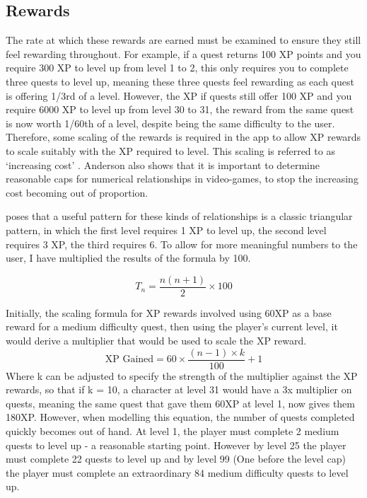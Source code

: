 \subsection{Rewards}
The rate at which these rewards are earned must be examined to ensure they still feel rewarding throughout. 
For example, if a quest returns 100 XP points and you require 300 XP to level up from level 1 to 2, this only requires you to complete three quests to level up, meaning these three quests feel rewarding as each quest is offering 1/3rd of a level.
However, the XP if quests still offer 100 XP and you require 6000 XP to level up from level 30 to 31, the reward from the same quest is now worth 1/60th of a level, despite being the same difficulty to the user.
Therefore, some scaling of the rewards is required in the app to allow XP rewards to scale suitably with the XP required to level.
This scaling is referred to as `increasing cost' \citep{1_anderson_2016}.
Anderson also shows that it is important to determine reasonable caps for numerical relationships in video-games, to stop the increasing cost becoming out of proportion.

\cite{1_anderson_2016} poses that a useful pattern for these kinds of relationships is a classic triangular pattern, in which the first level requires 1 XP to level up, the second level requires 3 XP, the third requires 6. To allow for more meaningful numbers to the user, I have multiplied the results of the formula by 100.

\begin{equation} \label{eq:xprequiredfornextlevel}
	T_n= \frac{n(n+1)}{2} \times 100
\end{equation}

Initially, the scaling formula for XP rewards involved using 60XP as a base reward for a medium difficulty quest, then using the player's current level, it would derive a multiplier that would be used to scale the XP reward.
\begin{equation} \label{eq:xpgainedlinear}
	\textrm{XP Gained} = 60 \times \frac{(n - 1) \times k}{100} + 1
\end{equation}
Where k can be adjusted to specify the strength of the multiplier against the XP rewards, so that if k = 10, a character at level 31 would have a 3x multiplier on quests, meaning the same quest that gave them 60XP at level 1, now gives them 180XP.
However, when modelling this equation, the number of quests completed quickly becomes out of hand. 
At level 1, the player must complete 2 medium quests to level up - a reasonable starting point.
However by level 25 the player must complete 22 quests to level up and by level 99 (One before the level cap) the player must complete an extraordinary 84 medium difficulty quests to level up.

